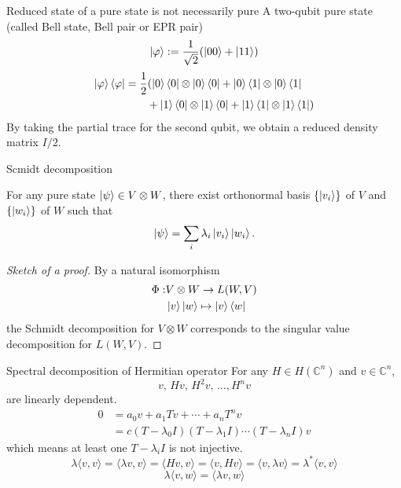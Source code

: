\documentclass[10pt]{beamer}
\begin{document}
\begin{frame}{Reduced state of a pure state is not necessarily pure}
A two-qubit pure state (called Bell state, Bell pair or EPR pair)
\begin{align*}
\ket{\varphi} := \frac1{\sqrt{2}}(\ket{00}+\ket{11})
\end{align*}
\begin{align*}
\ket{\varphi}\bra{\varphi}&=\frac12(\ket{0}\bra{0}\otimes \ket{0}\bra{0} + \ket{0}\bra{1}\otimes \ket{0}\bra{1} \\
&\qquad + \ket{1}\bra{0}\otimes \ket{1}\bra{0} + \ket{1}\bra{1}\otimes \ket{1}\bra{1} )
\end{align*}
By taking the partial trace for the second qubit, we obtain a reduced density matrix $I/2$.
\end{frame}
\fi


\begin{frame}{Scmidt decomposition}
\begin{theorem}
For any pure state $\ket{\psi}\in V\otimes W$, there exist orthonormal basis $\{\ket{v_i}\}$ of $V$ and $\{\ket{w_i}\}$ of $W$ such that
\begin{equation*}
\ket{\psi}=\sum_i\lambda_i \ket{v_i}\ket{w_i}.
\end{equation*}
\end{theorem}
\begin{proof}[Sketch of a proof]
By a natural isomorphism
\begin{align*}
\Phi:& V\otimes W \to L(W,V)\\
&\ket{v}\ket{w}\mapsto \ket{v}\bra{w}
\end{align*}
the Schmidt decomposition for $V\otimes W$ corresponds to the singular value decomposition for $L(W, V)$.
\end{proof}
\end{frame}
\fi

\begin{frame}{Spectral decomposition of Hermitian operator}
For any $H\in H(\mathbb{C}^n)$ and $v\in \mathbb{C}^n$,
\begin{equation*}
v,\, Hv,\, H^2v,\,\dotsc,H^nv
\end{equation*}
are linearly dependent.
\begin{align*}
0 &= a_0v+a_1 Tv+\dotsb+a_nT^nv\\
 &= c(T-\lambda_0 I)(T-\lambda_1 I)\dotsm(T-\lambda_n I)v
\end{align*}
which means at least one $T-\lambda_i I$ is not injective.
\begin{equation*}
\lambda \langle v, v\rangle
=\langle \lambda v, v\rangle
=\langle H v, v\rangle
=\langle v, H v\rangle
=\langle v, \lambda v\rangle
=\lambda^* \langle v, v\rangle
\end{equation*}
\begin{equation*}
\lambda \langle v, w\rangle
=\langle \lambda v, w\rangle
\end{equation*}

\end{frame}
\end{document}
